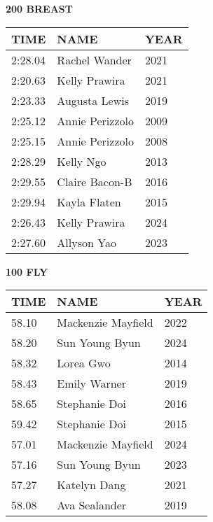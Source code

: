 \begin{minipage}[t]{0.48\textwidth}
\centering
\textbf{200 BREAST}\\[0.05cm]
\begin{tabular}{@{}p{1.8cm}p{2.8cm}p{1.2cm}@{}}
\hline
\textbf{TIME} & \textbf{NAME} & \textbf{YEAR} \\
\hline
2:28.04 & Rachel Wander & 2021 \\
2:20.63 & Kelly Prawira & 2021 \\
2:23.33 & Augusta Lewis & 2019 \\
2:25.12 & Annie Perizzolo & 2009 \\
2:25.15 & Annie Perizzolo & 2008 \\
2:28.29 & Kelly Ngo & 2013 \\
2:29.55 & Claire Bacon-B & 2016 \\
2:29.94 & Kayla Flaten & 2015 \\
2:26.43 & Kelly Prawira & 2024 \\
2:27.60 & Allyson Yao & 2023 \\
\hline
\end{tabular}
\end{minipage}\hfill
\begin{minipage}[t]{0.48\textwidth}
\centering
\textbf{100 FLY}\\[0.05cm]
\begin{tabular}{@{}p{1.8cm}p{2.8cm}p{1.2cm}@{}}
\hline
\textbf{TIME} & \textbf{NAME} & \textbf{YEAR} \\
\hline
58.10 & Mackenzie Mayfield & 2022 \\
58.20 & Sun Young Byun & 2024 \\
58.32 & Lorea Gwo & 2014 \\
58.43 & Emily Warner & 2019 \\
58.65 & Stephanie Doi & 2016 \\
59.42 & Stephanie Doi & 2015 \\
57.01 & Mackenzie Mayfield & 2024 \\
57.16 & Sun Young Byun & 2023 \\
57.27 & Katelyn Dang & 2021 \\
58.08 & Ava Sealander & 2019 \\
\hline
\end{tabular}
\end{minipage}

\vspace{0.4cm}

